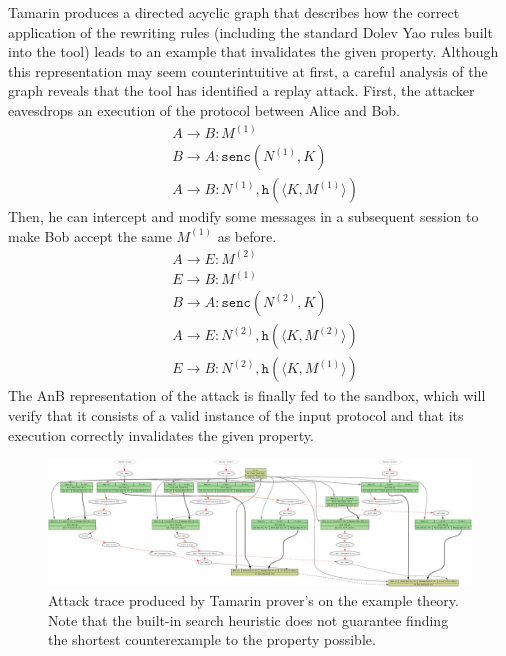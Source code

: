\begin{enumerate}
    Tamarin produces a directed acyclic graph that describes how the correct application of the rewriting rules (including the standard Dolev Yao rules built into the tool) leads to an example that invalidates the given property. Although this representation may seem counterintuitive at first, a careful analysis of the graph reveals that the tool has identified a replay attack. First, the attacker eavesdrops an execution of the protocol between Alice and Bob.
    \begin{align*}
        &A \to B: M^{(1)}\\
        &B \to A: \texttt{senc}(N^{(1)}, K)\\
        &A \to B: N^{(1)}, \texttt{h}(\langle K, M^{(1)} \rangle)
    \end{align*}
    Then, he can intercept and modify some messages in a subsequent session to make Bob accept the same $M^{(1)}$ as before.
    \begin{align*}
        &A \to E: M^{(2)}\\
        &E \to B: M^{(1)}\\
        &B \to A: \texttt{senc}(N^{(2)}, K)\\
        &A \to E: N^{(2)}, \texttt{h}(\langle K, M^{(2)} \rangle)\\
        &E \to B: N^{(2)}, \texttt{h}(\langle K, M^{(1)} \rangle)
    \end{align*}
The AnB representation of the attack is finally fed to the sandbox, which will verify that it consists of a valid instance of the input protocol and that its execution correctly invalidates the given property.

    \begin{figure}
        \includegraphics[width=\textwidth]{Figures/exampletrace.png}
        \centering
        \caption{Attack trace produced by Tamarin prover's on the example theory. Note that the built-in search heuristic does not guarantee finding the shortest counterexample to the property possible.}
        \label{fig:exampletrace}
    \end{figure}
\end{enumerate}

